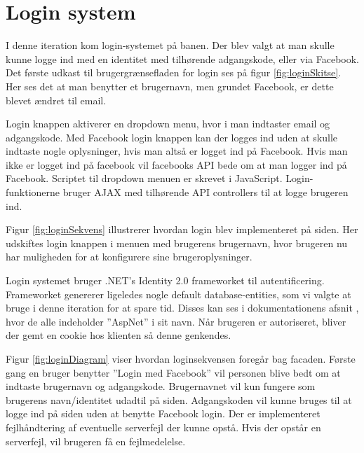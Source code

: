 \section{Login system}
\label{sec:LoginIT2}

I denne iteration kom login-systemet på banen. Der blev valgt at man skulle kunne logge ind med en identitet med tilhørende adgangskode, eller via Facebook. Det første udkast til brugergrænsefladen for login ses på figur \ref{fig:loginSkitse}. Her ses det at man benytter et brugernavn, men grundet Facebook, er dette blevet ændret til email.


Login knappen aktiverer en dropdown menu, hvor i man indtaster email og adgangskode. Med Facebook login knappen kan der logges ind uden at skulle indtaste nogle oplysninger, hvis man altså er logget ind på Facebook. Hvis man ikke er logget ind på facebook vil facebooks API bede om at man logger ind på Facebook. Scriptet til dropdown menuen er skrevet i JavaScript. Login-funktionerne bruger AJAX med tilhørende API controllers til at logge brugeren ind.


Figur \ref{fig:loginSekvens} illustrerer hvordan login blev implementeret på siden. Her udskiftes login knappen i menuen med brugerens brugernavn, hvor brugeren nu har muligheden for at konfigurere sine brugeroplysninger. 

Login systemet bruger .NET's Identity 2.0 frameworket til autentificering. Frameworket genererer ligeledes nogle default database-entities, som vi valgte at bruge i denne iteration for at spare tid. Disses kan ses i dokumentationens afsnit , hvor de alle indeholder ''AspNet'' i sit navn.  Når brugeren er autoriseret, bliver der gemt en cookie hos klienten så denne genkendes.


Figur \ref{fig:loginDiagram} viser hvordan loginsekvensen foregår bag facaden. Første gang en bruger benytter ''Login med Facebook'' vil personen blive bedt om at indtaste brugernavn og adgangskode. Brugernavnet vil kun fungere som brugerens navn/identitet udadtil på siden. Adgangskoden vil kunne bruges til at logge ind på siden uden at benytte Facebook login. Der er implementeret fejlhåndtering af eventuelle serverfejl der kunne opstå. Hvis der opstår en serverfejl, vil brugeren få en fejlmedelelse.

